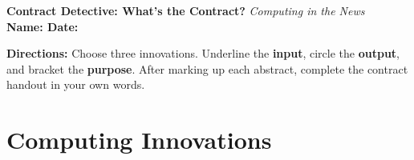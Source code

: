 \documentclass[12pt]{article}
\begin{document}
\noindent\textbf{Contract Detective: What's the Contract?} \textit{Computing in the News} \hfill \\  \textbf{Name: \underline{\hspace{3in}} Date: \underline{\hspace{1in}}}

\noindent\textbf{Directions:} Choose three innovations. Underline the \textbf{input}, circle the \textbf{output}, and bracket the \textbf{purpose}. After marking up each abstract, complete the contract handout in your own words.

\vspace{1em}
\section*{Computing Innovations}
\end{document}
